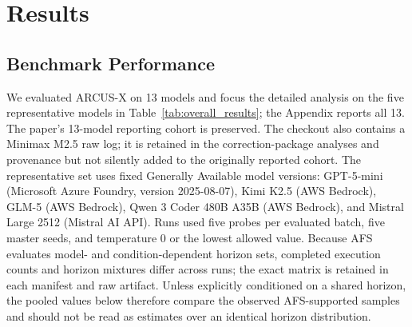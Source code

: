 \documentclass{article}
\begin{document}
\section{Results}

\subsection{Benchmark Performance}
We evaluated ARCUS-X on 13 models and focus the detailed analysis on the five representative models in Table~\ref{tab:overall_results}; the Appendix reports all 13. The paper's 13-model reporting cohort is preserved. The checkout also contains a Minimax M2.5 raw log; it is retained in the correction-package analyses and provenance but not silently added to the originally reported cohort. The representative set uses fixed Generally Available model versions: GPT-5-mini (Microsoft Azure Foundry, version 2025-08-07), Kimi K2.5 (AWS Bedrock), GLM-5 (AWS Bedrock), Qwen 3 Coder 480B A35B (AWS Bedrock), and Mistral Large 2512 (Mistral AI API). Runs used five probes per evaluated batch, five master seeds, and temperature 0 or the lowest allowed value. Because AFS evaluates model- and condition-dependent horizon sets, completed execution counts and horizon mixtures differ across runs; the exact matrix is retained in each manifest and raw artifact. Unless explicitly conditioned on a shared horizon, the pooled values below therefore compare the observed AFS-supported samples and should not be read as estimates over an identical horizon distribution.
\begin{table}[!ht]
\centering
\caption{Overall ARCUS-X trajectory-level performance over all recorded non-calibration probes. Exact Match uses the requested $z$ coordinates and all completed probes; taxonomy \emph{None} uses the same exact-match condition among valid responses. Asterisks indicate response validity below 75\%. Validity denotes the proportion of probes yielding cognitively analyzable responses.}
\label{tab:overall_results}
\scriptsize
{}
\end{table}
\end{document}
